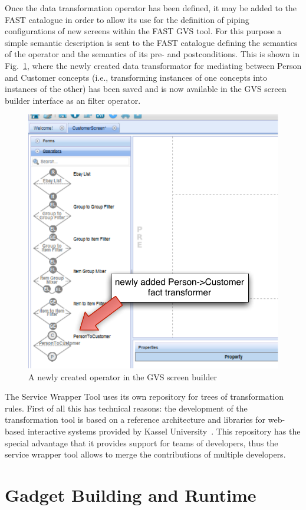 Once the data transformation operator has been defined, it may be added to the FAST catalogue in order to allow its use for the definition of piping configurations of new screens within the FAST GVS tool. For this purpose a simple semantic description is sent to the FAST catalogue defining the semantics of the operator and the semantics of its pre- and postconditions. This is shown in Fig.~\ref{fig:operator_in_screen_builder}, where the newly created data transformator for mediating between Person and Customer concepts (i.e., transforming instances of one concepts into instances of the other) has been saved and is now available in the GVS screen builder interface as an filter operator. 

\begin{figure}[h]
  \begin{center}
\includegraphics[width=.6\linewidth]{images/operator_closeup}
    \caption{A newly created operator in the GVS screen builder}
    \label{fig:operator_in_screen_builder}
  \end{center}
\end{figure}

The Service Wrapper Tool uses its own repository for trees of transformation rules. First of all this has technical reasons: the development of the transformation tool is based on a reference architecture and libraries for web-based interactive systems provided by Kassel University~\cite{AsDH2009CVSM}. This repository has the special advantage that it provides support for teams of developers, thus the service wrapper tool allows to merge the contributions of multiple developers. 


\section{Gadget Building  and Runtime}


